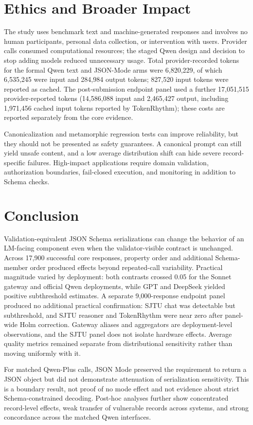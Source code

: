 \documentclass[11pt,a4paper]{article}
\begin{document}
\section{Ethics and Broader Impact}
The study uses benchmark text and machine-generated responses and involves no human participants, personal data collection, or intervention with users. Provider calls consumed computational resources; the staged Qwen design and decision to stop adding models reduced unnecessary usage. Total provider-recorded tokens for the formal Qwen text and JSON-Mode arms were 6,820,229, of which 6,535,245 were input and 284,984 output tokens; 827,520 input tokens were reported as cached. The post-submission endpoint panel used a further 17,051,515 provider-reported tokens (14,586,088 input and 2,465,427 output, including 1,971,456 cached input tokens reported by TokenRhythm); these costs are reported separately from the core evidence.

Canonicalization and metamorphic regression tests can improve reliability, but they should not be presented as safety guarantees. A canonical prompt can still yield unsafe content, and a low average distribution shift can hide severe record-specific failures. High-impact applications require domain validation, authorization boundaries, fail-closed execution, and monitoring in addition to Schema checks.

\section{Conclusion}
Validation-equivalent JSON Schema serializations can change the behavior of an LM-facing component even when the validator-visible contract is unchanged. Across 17,900 successful core responses, property order and additional Schema-member order produced effects beyond repeated-call variability. Practical magnitude varied by deployment: both contrasts crossed 0.05 for the Sonnet gateway and official Qwen deployments, while GPT and DeepSeek yielded positive subthreshold estimates. A separate 9,000-response endpoint panel produced no additional practical confirmation: SJTU chat was detectable but subthreshold, and SJTU reasoner and TokenRhythm were near zero after panel-wide Holm correction. Gateway aliases and aggregators are deployment-level observations, and the SJTU panel does not isolate hardware effects. Average quality metrics remained separate from distributional sensitivity rather than moving uniformly with it.

For matched Qwen-Plus calls, JSON Mode preserved the requirement to return a JSON object but did not demonstrate attenuation of serialization sensitivity. This is a boundary result, not proof of no mode effect and not evidence about strict Schema-constrained decoding. Post-hoc analyses further show concentrated record-level effects, weak transfer of vulnerable records across systems, and strong concordance across the matched Qwen interfaces.
\end{document}
